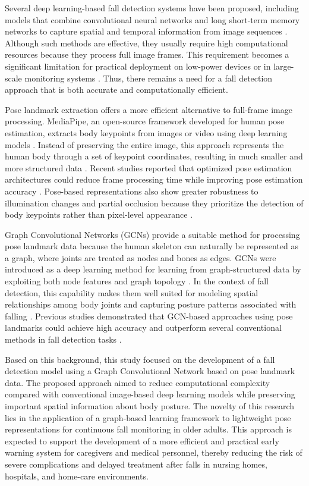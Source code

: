 \documentclass[10pt,TimesNewRoman,a4paper]{matrikenglish}
\begin{document}
Several deep learning-based fall detection systems have been proposed, including models that combine convolutional neural networks and long short-term memory networks to capture spatial and temporal information from image sequences \cite{Chhetri2021}. Although such methods are effective, they usually require high computational resources because they process full image frames. This requirement becomes a significant limitation for practical deployment on low-power devices or in large-scale monitoring systems \cite{Chhetri2021}. Thus, there remains a need for a fall detection approach that is both accurate and computationally efficient.

Pose landmark extraction offers a more efficient alternative to full-frame image processing. MediaPipe, an open-source framework developed for human pose estimation, extracts body keypoints from images or video using deep learning models \cite{Lugaresi2019}. Instead of preserving the entire image, this approach represents the human body through a set of keypoint coordinates, resulting in much smaller and more structured data \cite{Lugaresi2019}. Recent studies reported that optimized pose estimation architectures could reduce frame processing time while improving pose estimation accuracy \cite{Sengar2024}. Pose-based representations also show greater robustness to illumination changes and partial occlusion because they prioritize the detection of body keypoints rather than pixel-level appearance \cite{Raj2024}.

Graph Convolutional Networks (GCNs) provide a suitable method for processing pose landmark data because the human skeleton can naturally be represented as a graph, where joints are treated as nodes and bones as edges. GCNs were introduced as a deep learning method for learning from graph-structured data by exploiting both node features and graph topology \cite{Kipf2016}. In the context of fall detection, this capability makes them well suited for modeling spatial relationships among body joints and capturing posture patterns associated with falling \cite{Zahan2025}. Previous studies demonstrated that GCN-based approaches using pose landmarks could achieve high accuracy and outperform several conventional methods in fall detection tasks \cite{Zhang2023}.

Based on this background, this study focused on the development of a fall detection model using a Graph Convolutional Network based on pose landmark data. The proposed approach aimed to reduce computational complexity compared with conventional image-based deep learning models while preserving important spatial information about body posture. The novelty of this research lies in the application of a graph-based learning framework to lightweight pose representations for continuous fall monitoring in older adults. This approach is expected to support the development of a more efficient and practical early warning system for caregivers and medical personnel, thereby reducing the risk of severe complications and delayed treatment after falls in nursing homes, hospitals, and home-care environments.
\end{document}
